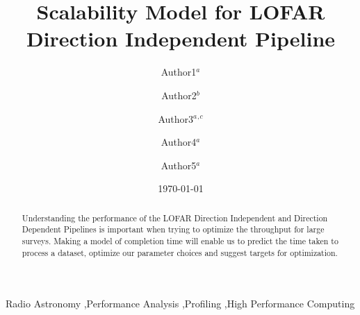 \documentclass[preprint,5p]{elsarticle}
\begin{document}
\sloppy

\begin{frontmatter}


\title{Scalability Model for LOFAR Direction Independent Pipeline}%
\author{Author1$^a$ }

\author{Author2$^b$}%
\author{Author3$^a$$^,$$^c$}%
\author{Author4$^a$}%
\author{Author5$^a$}%

\date{\today}%
\address{$^a$Affiliation Address 1}
\address{$^b$Affiliation Address 2}
\address{$^c$Affiliation Address 3}

\begin{abstract}
Understanding the performance of the LOFAR Direction Independent and Direction Dependent Pipelines is important when trying to optimize the throughput for large surveys. Making a model of completion time will enable us to predict the time taken to process a dataset, optimize our parameter choices and suggest targets for optimization. 

\end{abstract}
\begin{keyword}
Radio Astronomy \sep Performance Analysis \sep Profiling \sep High Performance Computing


\end{keyword}
\end{frontmatter}

%
\end{document}
